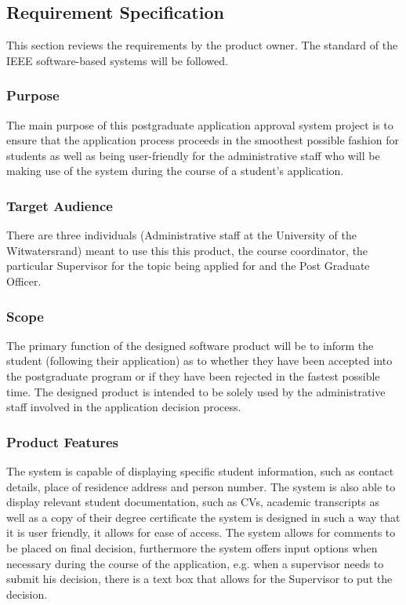 \documentclass[journal]{IEEEtran}
\begin{document}
\subsection{Requirement Specification}
This section reviews the requirements by the product owner. The standard of the IEEE software-based systems will be followed. 
\hfill \break \subsubsection{Purpose}
The main purpose of this postgraduate application approval system project is to ensure that the application process proceeds in the smoothest possible fashion for students as well as being user-friendly for the administrative staff who will be making use of the system during the course of a student's application.
\hfill \break \subsubsection{Target Audience}
There are three individuals (Administrative staff at the University of the Witwatersrand) meant to use this this product, the course coordinator, the particular Supervisor for the topic being applied for and the Post Graduate Officer.
\hfill \break \subsubsection{Scope}
The primary function of the designed software product will be to inform the student (following their application) as to whether they have been accepted into the postgraduate program or if they have been rejected in the fastest possible time. The designed product is intended to be solely used by the administrative staff involved in the application decision process.
\hfill \break \subsubsection{Product Features}
The system is capable of displaying specific student information, such as contact details, place of residence address and person number. The system is also able to display relevant student documentation, such as CVs, academic transcripts as well as a copy of their degree certificate the system is designed in such a way that it is user friendly, it allows for ease of access.  The system allows for comments to be placed on final decision, furthermore the system offers input options when necessary during the course of the application, e.g. when a supervisor needs to submit his decision, there is a text box that allows for the Supervisor to put the decision. 
\end{document}
